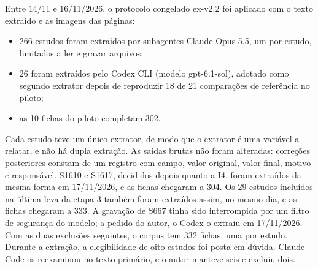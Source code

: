 Entre 14/11 e 16/11/2026, o protocolo congelado ex-v2.2 foi aplicado com o texto extraído e as imagens das páginas:
\begin{itemize}
  \item 266 estudos foram extraídos por subagentes Claude Opus 5.5, um por estudo, limitados a ler e gravar arquivos;
  \item 26 foram extraídos pelo Codex CLI (modelo gpt-6.1-sol), adotado como segundo extrator depois de
  reproduzir 18 de 21 comparações de referência no piloto;
  \item as 10 fichas do piloto completam 302.
\end{itemize}
Cada estudo teve um único extrator, de modo que o extrator é uma variável a relatar, e não há dupla extração. As
saídas brutas não foram alteradas: correções posteriores constam de um registro com campo, valor original, valor
final, motivo e responsável. S1610 e S1617, decididos depois quanto a I4, foram extraídos da mesma forma em
17/11/2026, e as fichas chegaram a 304. Os 29 estudos incluídos na última leva da etapa 3 também foram extraídos
assim, no mesmo dia, e as fichas chegaram a 333. A gravação de S667 tinha
sido interrompida por um filtro de segurança do modelo; a pedido do autor, o Codex o extraiu em 17/11/2026. Com as
duas exclusões seguintes, o corpus tem 332 fichas, uma por estudo. Durante a
extração, a elegibilidade de oito estudos foi posta em dúvida. Claude Code os reexaminou no texto primário, e o
autor manteve seis e excluiu dois.

